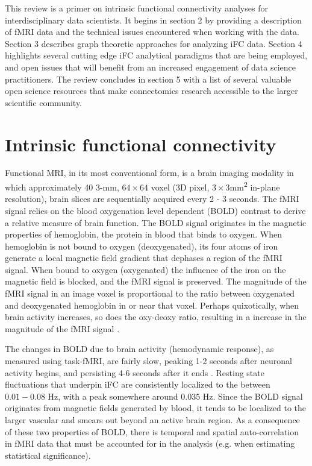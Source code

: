 This review is a primer on intrinsic functional connectivity analyses for interdisciplinary data scientists. It begins in section 2 by providing a description of fMRI data and the technical issues encountered when working with the data. Section 3 describes graph theoretic approaches for analyzing iFC data. Section 4 highlights several cutting edge iFC analytical paradigms that are being employed, and open issues that will benefit from an increased engagement of data science practitioners. The review concludes in section 5 with a list of several valuable open science resources that make connectomics research accessible to the larger scientific community.

\section{Intrinsic functional connectivity}

Functional MRI, in its most conventional form, is a brain imaging modality in which approximately 40 3-\si{\milli\meter}, $64 \times 64$ voxel (3D pixel, $3\times3$\si{\milli\meter\squared} in-plane resolution), brain slices are sequentially acquired every 2 - 3 seconds. The fMRI signal relies on the blood oxygenation level dependent (BOLD) contrast to derive a relative measure of brain function. The BOLD signal originates in the magnetic properties of hemoglobin, the protein in blood that binds to oxygen. When hemoglobin is not bound to oxygen (deoxygenated), its four atoms of iron generate a local magnetic field gradient that dephases a region of the fMRI signal. When bound to oxygen (oxygenated) the influence of the iron on the magnetic field is blocked, and the fMRI signal is preserved. The magnitude of the fMRI signal in an image voxel is proportional to the ratio between oxygenated and deoxygenated hemoglobin in or near that voxel. Perhaps quixotically, when brain activity increases, so does the oxy-deoxy ratio, resulting in a increase in the magnitude of the fMRI signal \cite{fmribook}. 

The changes in BOLD due to brain activity (hemodynamic response), as measured using task-fMRI, are fairly slow, peaking 1-2 seconds after neuronal activity begins, and persisting 4-6 seconds after it ends \cite{fmribook}. Resting state fluctuations that underpin iFC are consistently localized to the between $0.01-0.08$ \si{\hertz}, with a peak somewhere around $0.035$ \si{\hertz}\cite{biswal,cordes}. Since the BOLD signal originates from magnetic fields generated by blood, it tends to be localized to the larger vascular and smears out beyond an active brain region. As a consequence of these two properties of BOLD, there is temporal and spatial auto-correlation in fMRI data that must be accounted for in the analysis (e.g. when estimating statistical significance).

